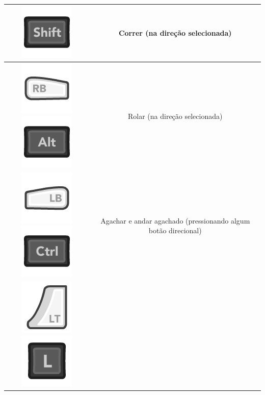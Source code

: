 \documentclass{article}
\begin{document}
\begin{longtable}{|c|c|}
\includegraphics[scale=0.3]{images/kShift.png}
 & Correr (na direção selecionada)
\\
\hline
\includegraphics[scale=0.3]{images/360_RB.png}
\includegraphics[scale=0.3]{images/kAlt.png}
& Rolar (na direção selecionada) 
\\
\hline
\includegraphics[scale=0.3]{images/360_LB.png}
\includegraphics[scale=0.3]{images/kCtrl.png}
& Agachar e andar agachado (pressionando algum botão direcional)
\\
\hline
\includegraphics[scale=0.3]{images/360_LT.png}
\includegraphics[scale=0.3]{images/kL.png}

\end{longtable}
\end{document}
